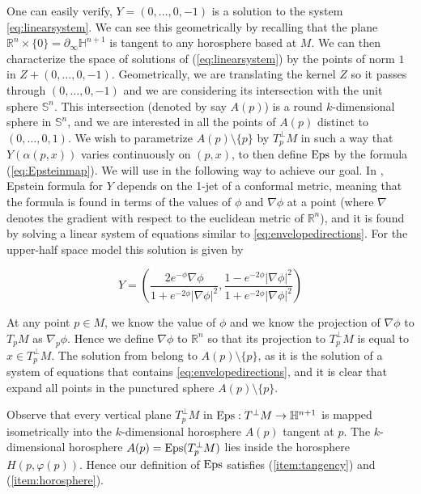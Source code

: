 \documentclass[12pt]{amsart}
\newcommand{\HH}{\mathbb{H}}
\newcommand{\RR}{\mathbb{R}}
\newcommand{\Eps}{{\rm Eps}}
\begin{document}
One can easily verify, $Y=(0,\ldots,0,-1)$ is a solution to the system \ref{eq:linearsystem}. We can see this geometrically by recalling that the plane $\mathbb{R}^n\times\lbrace0\rbrace = \partial_{\infty}\HH^{n+1}$ is tangent to any horosphere based at $M$. We can then characterize the space of solutions of (\ref{eq:linearsystem}) by the points of norm $1$ in $Z+(0,\ldots,0,-1)$. Geometrically, we are translating the kernel $Z$ so it passes through $(0,\ldots,0,-1)$ and we are considering its intersection with the unit sphere $\mathbb{S}^n$. This intersection (denoted by say $A(p)$) is a round $k$-dimensional sphere in $\mathbb{S}^n$, and we are interested in all the points of $A(p)$ distinct to $(0,\ldots,0,1)$. We wish to parametrize $A(p)\setminus\lbrace p\rbrace$ by $T^\perp_pM$ in such a way that $Y(\alpha(p,x))$ varies continuously on $(p,x)$, to then define $\Eps$ by the formula (\ref{eq:Epsteinmap}). We will use \cite{Epstein84} in the following way to achieve our goal. In \cite{Epstein84}, Epstein formula for $Y$ depends on the 1-jet of a conformal metric, meaning that the formula is found in terms of the values of $\phi$ and $\nabla\phi$ at a point (where $\nabla$ denotes the gradient with respect to the euclidean metric of $\RR^n$), and it is found by solving a linear system of equations similar to \eqref{eq:envelopedirections}. For the upper-half space model this solution is given by 

\begin{equation}\label{eq:EpsteinOGSolution}
    Y = \left(\frac{2e^{-\phi}\nabla\phi}{1+e^{-2\phi}|\nabla \phi|^2}, \frac{1-e^{-2\phi}|\nabla\phi|^2}{1+e^{-2\phi}|\nabla \phi|^2} \right)
\end{equation}

At any point $p\in M$, we know the value of $\phi$ and we know the projection of $\nabla\phi$ to $T_p M$ as $\nabla_p\phi$. Hence we define $\nabla\phi$ to $\mathbb{R}^n$ so that its projection to $T^\perp_p M$ is equal to $x\in T^\perp_pM$. The solution from \cite{Epstein84} belong to $A(p)\setminus\lbrace p\rbrace$, as it is the solution of a system of equations that contains \eqref{eq:envelopedirections}, and it is clear that expand all points in the punctured sphere $A(p)\setminus\lbrace p\rbrace$.

Observe that every vertical plane $T^\perp_pM$ in $\Eps: T^\perp M \rightarrow \HH^{n+1}$ is mapped isometrically into the $k$-dimensional horosphere $A(p)$ tangent at $p$. The $k$-dimensional horosphere $A(p)=\Eps (T^\perp_p M)$ lies inside the horosphere $H(p,\varphi(p))$. Hence our definition of $\Eps$ satisfies (\ref{item:tangency}) and (\ref{item:horosphere}).
\end{document}
